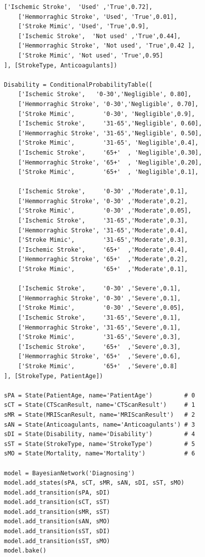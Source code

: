 \documentclass[a4paper, 11pt]{article}
\begin{document}
\begin{lstlisting}[title=diagnosing.py]
    ['Ischemic Stroke',  'Used' ,'True',0.72],
    ['Hemmorraghic Stroke', 'Used', 'True',0.01],
    ['Stroke Mimic', 'Used', 'True',0.9],
    ['Ischemic Stroke',  'Not used' ,'True',0.44],
    ['Hemmorraghic Stroke', 'Not used', 'True',0.42 ],
    ['Stroke Mimic', 'Not used', 'True',0.95]
], [StrokeType, Anticoagulants])

Disability = ConditionalProbabilityTable([
    ['Ischemic Stroke',   '0-30','Negligible', 0.80],
    ['Hemmorraghic Stroke', '0-30','Negligible', 0.70],
    ['Stroke Mimic',        '0-30', 'Negligible',0.9],
    ['Ischemic Stroke',     '31-65','Negligible', 0.60],
    ['Hemmorraghic Stroke', '31-65','Negligible', 0.50],
    ['Stroke Mimic',        '31-65', 'Negligible',0.4],
    ['Ischemic Stroke',     '65+'  , 'Negligible',0.30],
    ['Hemmorraghic Stroke', '65+'  , 'Negligible',0.20],
    ['Stroke Mimic',        '65+'  , 'Negligible',0.1],

    ['Ischemic Stroke',     '0-30' ,'Moderate',0.1],
    ['Hemmorraghic Stroke', '0-30' ,'Moderate',0.2],
    ['Stroke Mimic',        '0-30' ,'Moderate',0.05],
    ['Ischemic Stroke',     '31-65','Moderate',0.3],
    ['Hemmorraghic Stroke', '31-65','Moderate',0.4],
    ['Stroke Mimic',        '31-65','Moderate',0.3],
    ['Ischemic Stroke',     '65+'  ,'Moderate',0.4],
    ['Hemmorraghic Stroke', '65+'  ,'Moderate',0.2],
    ['Stroke Mimic',        '65+'  ,'Moderate',0.1],

    ['Ischemic Stroke',     '0-30' ,'Severe',0.1],
    ['Hemmorraghic Stroke', '0-30' ,'Severe',0.1],
    ['Stroke Mimic',        '0-30' ,'Severe',0.05],
    ['Ischemic Stroke',     '31-65','Severe',0.1],
    ['Hemmorraghic Stroke', '31-65','Severe',0.1],
    ['Stroke Mimic',        '31-65','Severe',0.3],
    ['Ischemic Stroke',     '65+'  ,'Severe',0.3],
    ['Hemmorraghic Stroke', '65+'  ,'Severe',0.6],
    ['Stroke Mimic',        '65+'  ,'Severe',0.8]
], [StrokeType, PatientAge])

sPA = State(PatientAge, name='PatientAge')         # 0
sCT = State(CTScanResult, name='CTScanResult')     # 1
sMR = State(MRIScanResult, name='MRIScanResult')   # 2
sAN = State(Anticoagulants, name='Anticoagulants') # 3
sDI = State(Disability, name='Disability')         # 4
sST = State(StrokeType, name='StrokeType')         # 5
sMO = State(Mortality, name='Mortality')           # 6

model = BayesianNetwork('Diagnosing')
model.add_states(sPA, sCT, sMR, sAN, sDI, sST, sMO)
model.add_transition(sPA, sDI)
model.add_transition(sCT, sST)
model.add_transition(sMR, sST)
model.add_transition(sAN, sMO)
model.add_transition(sST, sDI)
model.add_transition(sST, sMO)
model.bake()


\end{lstlisting}
\end{document}
